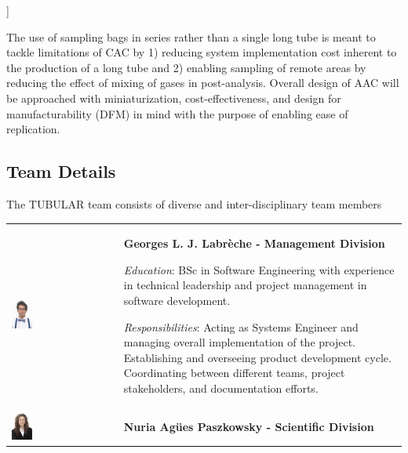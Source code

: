]\documentclass[a4paper,12pt,twoside]{article}
\begin{document}
The use of sampling bags in series rather than a single long tube is meant to tackle limitations of CAC by 1) reducing system implementation cost inherent to the production of a long tube and 2) enabling sampling of remote areas by reducing the effect of mixing of gases in post-analysis. Overall design of AAC will be approached with miniaturization, cost-effectiveness, and design for manufacturability (DFM) in mind with the purpose of enabling ease of replication.
\pagebreak
\subsection{Team Details}
The TUBULAR team consists of diverse and inter-disciplinary team members 

\bigskip


\begin{longtable}[]{m{} m{}}

 \includegraphics[width=0.2\textwidth]{1-introduction/img/georges-louis-joseph-labreche.jpg}  & \textbf{Georges L. J. Labrèche - Management Division}

\smallskip
\textit{Education}: BSc in Software Engineering with experience in technical leadership and project management in software development.

\smallskip
\textit{Responsibilities}: Acting as Systems Engineer and managing overall implementation of the project. Establishing and overseeing product development cycle. Coordinating between different teams, project stakeholders, and documentation efforts.                          
\bigskip
\\

\includegraphics[width=0.2\textwidth]{1-introduction/img/agues-paszkowsky.jpg} & \textbf{Nuria Agües Paszkowsky - Scientific Division}


\end{longtable}
\end{document}
